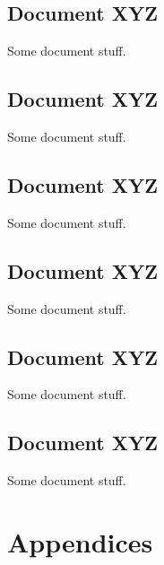 \documentclass[oneside]{book}
\begin{document}
\chapter{Document XYZ}

Some document stuff.


\chapter{Document XYZ}

Some document stuff.


\chapter{Document XYZ}

Some document stuff.


\chapter{Document XYZ}

Some document stuff.


\chapter{Document XYZ}

Some document stuff.


\chapter{Document XYZ}

Some document stuff.


\appendix \setcounter{secnumdepth}{-2}
\part{Appendices}
\end{document}
